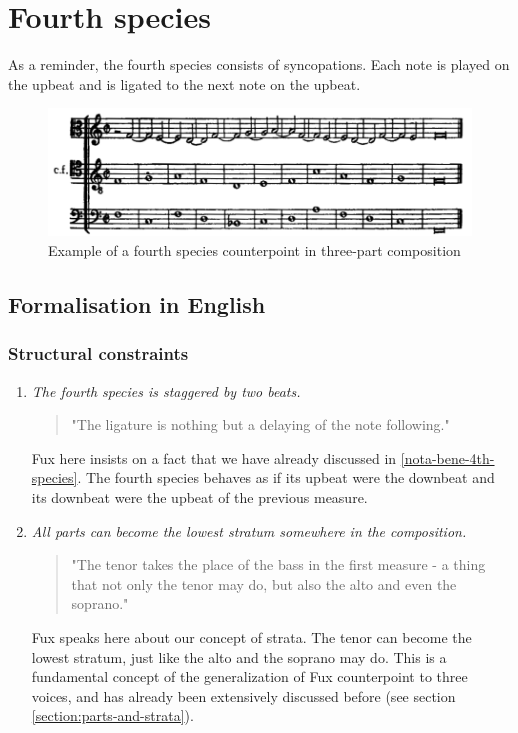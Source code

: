\section{Fourth species}
As a reminder, the fourth species consists of syncopations. Each note is played on the upbeat and is ligated to the next note on the upbeat.
\begin{figure}[h]
    \centering
    \includegraphics[width=1\textwidth]{Images/Species_examples/4sp-example.png}
    \caption{Example of a fourth species counterpoint in three-part composition}
    \label{fig:example-4sp}
\end{figure}

\subsection{Formalisation in English}\label{formalisation-en-4th}
\subsubsection{Structural constraints}
\begin{enumerate}[wide, label=\bfseries 4.S\arabic*]
\setcounter{enumi}{0}
    \item \textit{The fourth species is staggered by two beats.} \label{rule:delaying}    
    \begin{quotation}
        "The ligature is nothing but a delaying of the note following."
        \textcite[p.95]{GaPEng}
    \end{quotation}
    Fux here insists on a fact that we have already discussed in \ref{nota-bene-4th-species}. The fourth species behaves as if its upbeat were the downbeat and its downbeat were the upbeat of the previous measure.

    \item \textit{All parts can become the lowest stratum somewhere in the composition.} \label{rule:tenor-might-take-place-of-bass}    
    \begin{quotation}
        "The tenor takes the place of the bass in the first measure - a thing that not only the tenor may do, but also the alto and even the soprano."
        \textcite[p.100]{GaPEng}
    \end{quotation}
    Fux speaks here about our concept of strata. The tenor can become the lowest stratum, just like the alto and the soprano may do. This is a fundamental concept of the generalization of Fux counterpoint to three voices, and has already been extensively discussed before (see section \ref{section:parts-and-strata}).
\end{enumerate}

